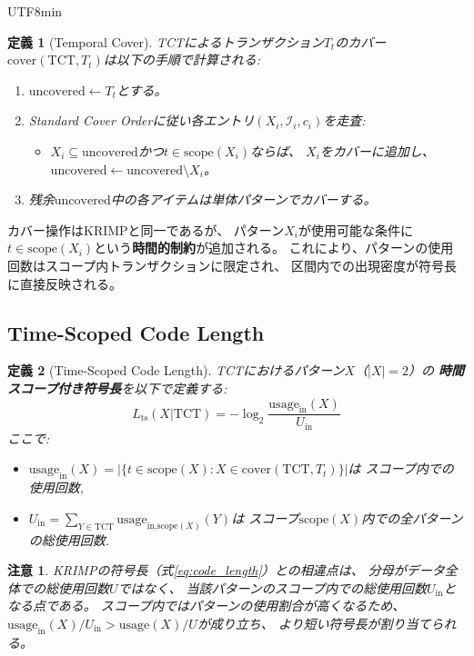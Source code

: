 \documentclass[11pt,a4paper]{article}
\newtheorem{definition}{定義}
\newtheorem{remark}{注意}
\begin{document}
\begin{CJK}{UTF8}{min}
\begin{definition}[Temporal Cover]\label{def:tcover}
TCTによるトランザクション$T_t$のカバー
$\text{cover}(\text{TCT}, T_t)$は以下の手順で計算される:
\begin{enumerate}
  \item $\text{uncovered} \leftarrow T_t$とする。
  \item Standard Cover Orderに従い各エントリ$(X_i, \mathcal{I}_i, c_i)$を走査:
    \begin{itemize}
      \item $X_i \subseteq \text{uncovered}$かつ$t \in \text{scope}(X_i)$ならば、
        $X_i$をカバーに追加し、$\text{uncovered} \leftarrow \text{uncovered} \setminus X_i$。
    \end{itemize}
  \item 残余$\text{uncovered}$中の各アイテムは単体パターンでカバーする。
\end{enumerate}
\end{definition}

カバー操作はKRIMPと同一であるが、
パターン$X_i$が使用可能な条件に
$t \in \text{scope}(X_i)$という\textbf{時間的制約}が追加される。
これにより、パターンの使用回数はスコープ内トランザクションに限定され、
区間内での出現密度が符号長に直接反映される。

\subsection{Time-Scoped Code Length}

\begin{definition}[Time-Scoped Code Length]\label{def:tscl}
TCTにおけるパターン$X$（$|X| = 2$）の
\textbf{時間スコープ付き符号長}を以下で定義する:
\begin{equation}\label{eq:tscl}
  L_{\text{ts}}(X|\text{TCT}) =
    -\log_2 \frac{\text{usage}_{\text{in}}(X)}{U_{\text{in}}}
\end{equation}
ここで:
\begin{itemize}
  \item $\text{usage}_{\text{in}}(X) = |\{t \in \text{scope}(X) : X \in \text{cover}(\text{TCT}, T_t)\}|$は
    スコープ内での使用回数,
  \item $U_{\text{in}} = \sum_{Y \in \text{TCT}} \text{usage}_{\text{in,scope}(X)}(Y)$は
    スコープ$\text{scope}(X)$内での全パターンの総使用回数.
\end{itemize}
\end{definition}

\begin{remark}
KRIMPの符号長（式\ref{eq:code_length}）との相違点は、
分母がデータ全体での総使用回数$U$ではなく、
当該パターンのスコープ内での総使用回数$U_{\text{in}}$となる点である。
スコープ内ではパターンの使用割合が高くなるため、
$\text{usage}_{\text{in}}(X)/U_{\text{in}} > \text{usage}(X)/U$が成り立ち、
より短い符号長が割り当てられる。
\end{remark}


\end{CJK}
\end{document}
